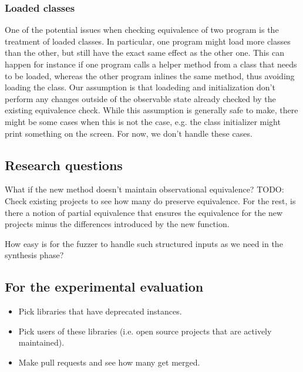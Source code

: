 \documentclass[runningheads,a4paper]{llncs}
\begin{document}
\subsubsection{Loaded classes}

One of the potential issues when checking equivalence of two program
is the treatment of loaded classes. In particular, one program might
load more classes than the other, but still have the exact same effect
as the other one. This can happen for instance if one program calls a
helper method from a class that needs to be loaded, whereas the other
program inlines the same method, thus avoiding loading the class.  Our
assumption is that loadeding and initialization don't perform any
changes outside of the observable state already checked by the
existing equivalence check.  While this assumption is generally safe
to make, there might be some cases when this is not the case, e.g. the
class initializer might print something on the screen. For now, we
don't handle these cases.



\subsection{Research questions}

What if the new method doesn't maintain observational equivalence?
TODO: Check existing projects to see how many do preserve equivalence.
For the rest, is there a notion of partial equivalence that ensures the equivalence
for the new projects minus the differences introduced by the new function.

How easy is for the fuzzer to handle such structured inputs as we need in the
synthesis phase?


\subsection{For the experimental evaluation}
\begin{itemize}
\item Pick libraries that have deprecated instances.
\item Pick users of these libraries (i.e. open source projects that are actively maintained).
\item Make pull requests and see how many get merged.
\end{itemize}  
\end{document}
